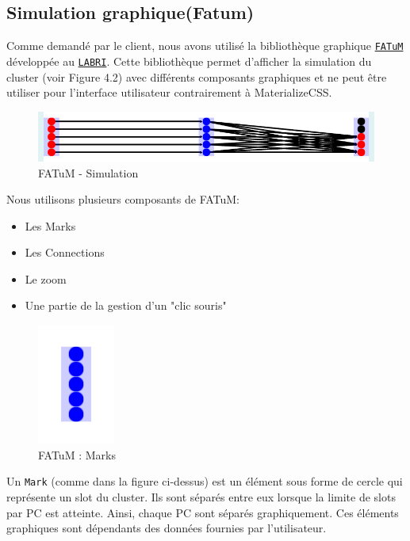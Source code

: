 \subsection{Simulation graphique(Fatum)}
Comme demandé par le client, nous avons utilisé la bibliothèque graphique \href{http://www.labri.fr/perso/aperrot/fatum/index.html}{{\tt FATuM}} développée au \href{http://www.labri.fr/}{{\tt LABRI}}. Cette bibliothèque permet d'afficher la simulation du cluster (voir Figure 4.2) avec différents composants graphiques et ne peut être utiliser pour l'interface utilisateur contrairement à MaterializeCSS.
\begin{figure}[H]
  \centering
    \includegraphics[scale=0.5]{images/graphiqueExemple.png}
        \caption{FATuM - Simulation}
\end{figure}

Nous utilisons plusieurs composants de FATuM:
\begin{itemize}
\item Les Marks
\item Les Connections
\item Le zoom
\item Une partie de la gestion d'un "clic souris"\\
\end{itemize}

\begin{figure}[H]
  \centering
    \includegraphics[scale=0.5]{images/marks.png}
        \caption{FATuM : Marks}
\end{figure}
Un {\tt Mark} (comme dans la figure ci-dessus) est un élément sous forme de cercle qui représente un slot du cluster. Ils sont séparés entre eux lorsque la limite de slots par PC est atteinte. Ainsi, chaque PC sont séparés graphiquement. Ces éléments graphiques sont dépendants des données fournies par l'utilisateur.\\

